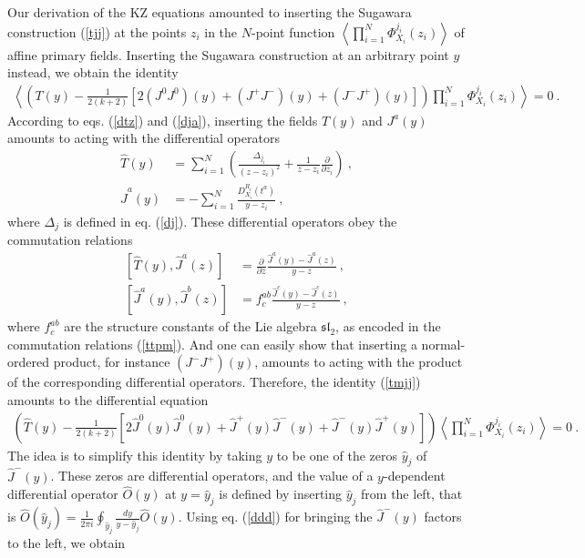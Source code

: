 \documentclass[12pt,a4paper,notitlepage]{report}
\newcommand \la {\left\langle}
\newcommand \ra {\right\rangle}
\newcommand \p {\partial}
\newcommand \pp[1] {{\frac{\p}{\p #1}}}
\numberwithin{equation}{section}
\theoremstyle{break}
\begin{document}
Our derivation of the KZ equations amounted to inserting the Sugawara construction (\ref{tjj})  at the points $z_i$ in the $N$-point function $\la \prod_{i=1}^N \Phi^{j_i}_{X_i}(z_i)\ra $ of affine primary fields. Inserting the Sugawara construction at an arbitrary point $y$ instead, we obtain the identity
\begin{align}
 \la \left(T(y)  - \frac{1}{2(k+2)}\left[ 2(J^0J^0)(y)+(J^+J^-)(y)+(J^-J^+)(y)\right]\right) \prod_{i=1}^N \Phi^{j_i}_{X_i}(z_i)\ra = 0\ .
\label{tmjj}
\end{align}
According to eqs. (\ref{dtz}) and (\ref{dja}), inserting the fields $T(y)$ and $J^a(y)$ amounts to acting with the differential operators 
\begin{align}
 \hat{T}(y) &= \sum_{i=1}^N \left(\frac{\Delta_{j_i}}{(z-z_i)^2} + \frac{1}{z-z_i}\pp{z_i}\right)\ ,
\label{tcy}
\\
 \hat{J}^a(y) &= - \sum_{i=1}^N \frac{D^{R_i}_{X_i}(t^a)}{y-z_i}\ ,
\label{jay}
\end{align}
where $\Delta_j$ is defined in eq. (\ref{dj}).
These differential operators obey the commutation relations
\begin{align}
 \left[\hat{T}(y),\hat{J}^a(z)\right] &= \pp{z} \frac{\hat{J}^a(y)-\hat{J}^a(z)}{y-z}\ ,
\label{dtd}
\\
 \left[ \hat{J}^a(y),\hat{J}^b(z)\right] &= f^{ab}_c \frac{\hat{J}^c(y)-\hat{J}^c(z)}{y-z}\ ,
\label{ddd}
\end{align}
where $f^{ab}_c$ are the structure constants of the Lie algebra $\mathfrak{sl}_2$, as encoded in the commutation relations (\ref{ttpm}).
And one can easily show that inserting a normal-ordered product, for instance $(J^-J^+)(y)$, amounts to acting with the product of the corresponding differential operators. Therefore, the identity (\ref{tmjj}) amounts to the differential equation
\begin{align}
 \left(\hat{T}(y) -\frac{1}{2(k+2)}\left[ 2\hat{J}^0(y)\hat{J}^0(y) +\hat{J}^+(y)\hat{J}^-(y)+\hat{J}^-(y)\hat{J}^+(y)\right]\right) \la \prod_{i=1}^N \Phi^{j_i}_{X_i}(z_i)\ra=0\ .
\end{align}
The idea is to simplify this identity by taking $y$ to be one of the zeros $\hat{y}_j$ of $ \hat{J}^-(y)$. These zeros are differential operators, and the value of a $y$-dependent differential operator $\hat{O}(y)$ at $y=\hat{y}_j$ is defined by inserting $\hat{y}_j$ from the left, that is $ \hat{O}(\hat{y}_j) = \frac{1}{2\pi i}\oint_{\hat{y}_j} \frac{dy}{y-\hat{y}_j} \hat{O}(y) $. Using eq. (\ref{ddd}) for bringing the $\hat{J}^-(y)$ factors to the left, we obtain
\end{document}
